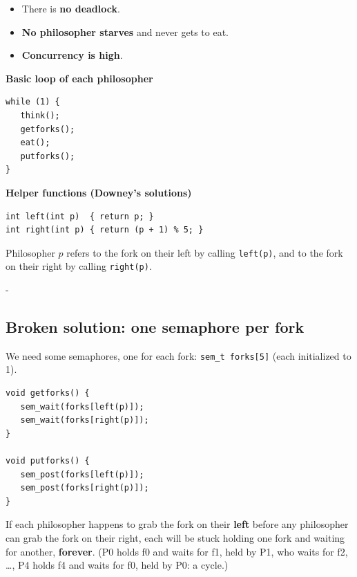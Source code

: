 \documentclass[11pt,a4paper]{article}
\makeatletter
\newcommand{\keepspace}[1]{\par\penalty-100\begingroup
  \setlength{\dimen@}{#1}\dimen@ii\pagegoal\advance\dimen@ii-\pagetotal
  \ifdim\dimen@>\dimen@ii\ifdim\dimen@ii>\z@\vfil\fi\break\fi\endgroup}
\makeatother
\begin{document}
\begin{keybox}
\begin{itemize}
  \item There is \textbf{no deadlock}.
  \item \textbf{No philosopher starves} and never gets to eat.
  \item \textbf{Concurrency is high}.
\end{itemize}
\end{keybox}

\begin{center}
\begin{minipage}[t]{0.42\textwidth}
\textbf{Basic loop of each philosopher}
\begin{lstlisting}[numbers=none]
while (1) {
   think();
   getforks();
   eat();
   putforks();
}
\end{lstlisting}
\end{minipage}\hfill
\begin{minipage}[t]{0.52\textwidth}
\textbf{Helper functions (Downey's solutions)}
\begin{lstlisting}[numbers=none]
int left(int p)  { return p; }
int right(int p) { return (p + 1) % 5; }
\end{lstlisting}
\end{minipage}
\end{center}
Philosopher \(p\) refers to the fork on their left by calling
\texttt{left(p)}, and to the fork on their right by calling
\texttt{right(p)}.

\keepspace{16\baselineskip}
\subsection{Broken solution: one semaphore per fork}

We need some semaphores, one for each fork: \texttt{sem\_t forks[5]} (each
initialized to 1).

\begin{lstlisting}
void getforks() {
   sem_wait(forks[left(p)]);
   sem_wait(forks[right(p)]);
}

void putforks() {
   sem_post(forks[left(p)]);
   sem_post(forks[right(p)]);
}
\end{lstlisting}

\begin{warnbox}
If each philosopher happens to grab the fork on their \textbf{left} before
any philosopher can grab the fork on their right, each will be stuck holding
one fork and waiting for another, \textbf{forever}. (P0 holds f0 and waits
for f1, held by P1, who waits for f2, \ldots, P4 holds f4 and waits for f0,
held by P0: a cycle.)
\end{warnbox}
\end{document}

